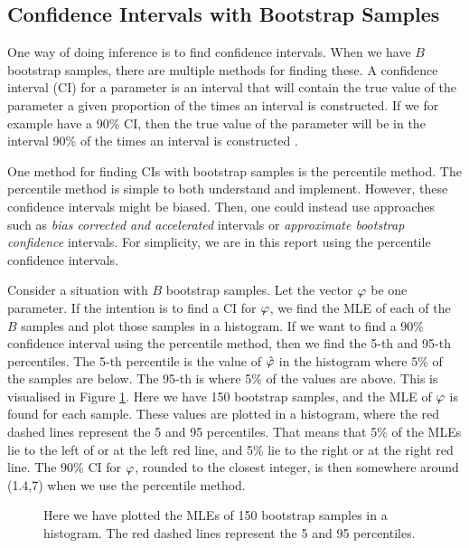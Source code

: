 
\subsection{Confidence Intervals with Bootstrap Samples}
\label{theory_ci_bootstrap}
One way of doing inference is to find confidence intervals. When we have $B$ bootstrap samples, there are multiple methods for finding these.  
A confidence interval (CI) for a parameter is an interval that will contain the true value of the parameter a given proportion of the times an interval is constructed. If we for example have a 90\% CI, then the true value of the parameter will be in the interval 90\% of the times an interval is constructed \citep{bootstrap}.

One method for finding CIs with bootstrap samples is the percentile method. The percentile method is simple to both understand and implement. However, these confidence intervals might be biased. Then, one could instead use approaches such as \textit{bias corrected and accelerated} intervals or \textit{approximate bootstrap confidence} intervals. For simplicity, we are in this report using the percentile confidence intervals. 


Consider a situation with $B$ bootstrap samples. Let the vector $\varphi$ be one parameter. If the intention is to find a CI for $\varphi$, we find the MLE of each of the $B$ samples and plot those samples in a histogram. If we want to find a 90\% confidence interval using the percentile method, then we find the 5-th and 95-th percentiles. The 5-th percentile is the value of $\hat{\varphi}$ in the histogram where 5\% of the samples are below. The 95-th is where 5\% of the values are above. This is visualised in Figure \ref{percentile_ci_example}. Here we have 150 bootstrap samples, and the MLE of $\varphi$ is found for each sample. These values are plotted in a histogram, where the red dashed lines represent the 5 and 95 percentiles. That means that 5\% of the MLEs lie to the left of or at the left red line, and 5\% lie to the right or at the right red line. The 90\% CI for $\varphi$, rounded to the closest integer, is then somewhere around (1.4,7) when we use the percentile method.
\begin{figure}
    \centering
    
    \caption[Bootstrap Example]{Here we have plotted the MLEs of 150 bootstrap samples in a histogram. The red dashed lines represent the 5 and 95 percentiles.}
    \label{percentile_ci_example}
\end{figure}

